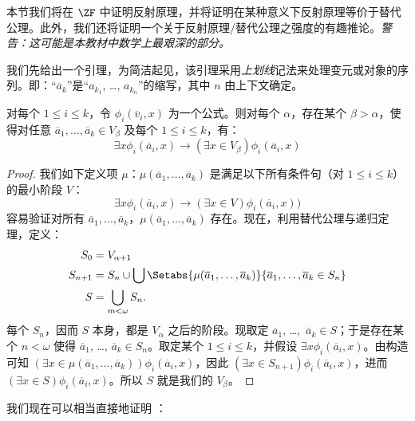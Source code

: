 \documentclass[../../../include/open-logic-section]{subfiles}
\begin{document}

本节我们将在 $\ZF$ 中证明反射原理，并将证明在某种意义下反射原理等价于替代公理。此外，我们还将证明一个关于反射原理/替代公理之强度的有趣推论。\emph{警告：这可能是本教材中数学上最艰深的部分。}

我们先给出一个引理，为简洁起见，该引理采用\emph{上划线}记法来处理变元或对象的序列。即：“$\overline{a}_k$”是“$a_{k_1}$, \dots, $a_{k_n}$”的缩写，其中 $n$ 由上下文确定。

\begin{lem}
对每个 $1 \leq i \leq k$，令 $\phi_i(\overline{v}_i, x)$ 为一个公式。则对每个 $\alpha$，存在某个 $\beta > \alpha$，使得对任意 $\overline{a}_1,
\ldots, \overline{a}_k \in V_\beta$ 及每个 $1 \leq i \leq k$，有：
\[
	\exists x\phi_i(\overline{a}_i, x) \rightarrow (\exists x \in V_\beta) \phi_i(\overline{a}_i, x)
\]
\end{lem}

\begin{proof}
我们如下定义项 $\mu$：$\mu(\overline{a}_1, \ldots,
\overline{a}_k)$ 是满足以下所有条件句（对 $1 \leq i \leq k$）的最小阶段 $V$：
\[
\exists x\phi_i(\overline{a}_i, x) \rightarrow (\exists x \in V) \phi_i(\overline{a}_i, x))
\]
容易验证对所有 $\overline{a}_1, \ldots, \overline{a}_k$，$\mu(\overline{a}_1, \ldots, \overline{a}_k)$ 存在。现在，利用替代公理与递归定理，定义：
\begin{align*}
	S_0 & = V_{\alpha+1}\\
	S_{n+1} & = S_n \cup \bigcup
	\Setabs{\mu(\overline{a}_1, \ldots, \overline{a}_k)}
	{\overline{a}_1, \ldots, \overline{a}_k \in S_n} \\
	S &= \bigcup_{m < \omega} S_n.
\end{align*}
每个 $S_n$，因而 $S$ 本身，都是 $V_\alpha$ 之后的阶段。现取定 $\overline{a}_1$, \dots,~$\overline{a}_k \in S$；于是存在某个 $n < \omega$ 使得 $\overline{a}_1$, \dots, $\overline{a}_k \in S_n$。取定某个 $1 \leq i \leq k$，并假设 $\exists x
\phi_i(\overline{a}_i,x)$。由构造可知 $(\exists x \in \mu(\overline{a}_1,
\ldots, \overline{a}_k))\phi_i(\overline{a}_i, x)$，因此 $(\exists x \in S_{n+1})\phi_i(\overline{a}_i, x)$，进而 $(\exists x \in S)\phi_i(\overline{a}_i, x)$。所以 $S$ 就是我们的 $V_\beta$。
\end{proof}


\noindent
我们现在可以相当直接地证明 ：
\end{document}
